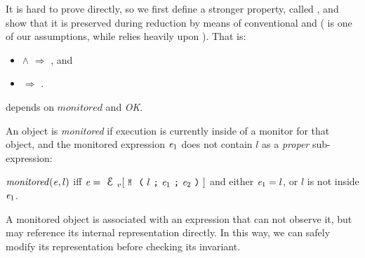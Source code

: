 


It is hard to prove  directly,
so we first define a stronger property,
called , and
show that it is preserved during reduction by means of conventional
 and  ( is one of our assumptions,
while  relies heavily upon ).
That is:
\SSI\begin{itemize}
\item {} $\wedge$  $\Rightarrow$ , and
\item {} $\Rightarrow$ .
\end{itemize}


 depends on $\mathit{monitored}$ and \emph{OK}. 

An object is \emph{monitored} if execution
is currently inside of a monitor for that object, and
the monitored expression ${\mathit{e}}_1$ does not
contain $l$ as a \emph{proper} sub-expression:

\indent $\mathit{monitored}({\mathit{e}},l)$ iff
$\e=\ctx_v[\M{l}{\e_1}{\e_2}]$ and either ${\mathit{e}}_1=l$, or $l$ is not inside ${\mathit{e}}_1$.%

\noindent A monitored object is associated with an expression that can not observe it, but may
reference its internal representation directly.
In this way, we can safely modify its representation before checking its invariant.

